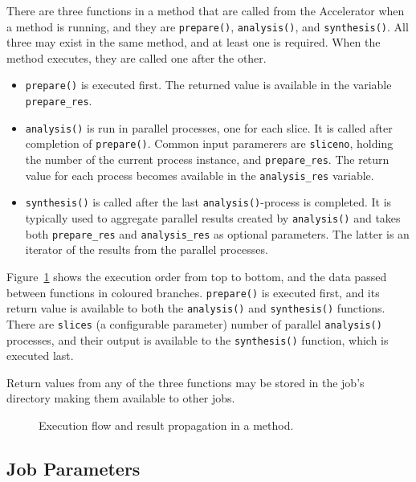 \documentclass[a4paper]{article}
\begin{document}
There are three functions in a method that are called from the
Accelerator when a method is running, and they are \texttt{prepare()},
\texttt{analysis()}, and \texttt{synthesis()}.  All three may exist in
the same method, and at least one is required.  When the method
executes, they are called one after the other.
\begin{itemize}
\item[] \texttt{prepare()} is executed first.  The returned value is
  available in the variable \texttt{prepare\_res}.
\item[] \texttt{analysis()} is run in parallel processes, one for each
  slice.  It is called after completion of \texttt{prepare()}.  Common
  input paramerers are \texttt{sliceno}, holding the number of the
  current process instance, and \texttt{prepare\_res}.  The return
  value for each process becomes available in the
  \texttt{analysis\_res} variable.
\item[] \texttt{synthesis()} is called after the last
  \texttt{analysis()}-process is completed.  It is typically used to
  aggregate parallel results created by \texttt{analysis()} and takes
  both \texttt{prepare\_res} and \texttt{analysis\_res} as optional
  parameters.  The latter is an iterator of the results from the
  parallel processes.
\end{itemize}
Figure~\ref{fig:prepanasyn} shows the execution order from top to
bottom, and the data passed between functions in coloured branches.
\texttt{prepare()} is executed first, and its return value is
available to both the \texttt{analysis()} and \texttt{synthesis()}
functions.  There are \texttt{slices} (a configurable parameter)
number of parallel \texttt{analysis()} processes, and their output is
available to the \texttt{synthesis()} function, which is executed
last.

Return values from any of the three functions may be stored in the
job's directory making them available to other jobs.


\begin{figure}[h!]
  \begin{center}
    
    \caption{Execution flow and result propagation in a method.}
    \label{fig:prepanasyn}
  \end{center}
\end{figure}

\clearpage





\subsection{Job Parameters}
\end{document}
